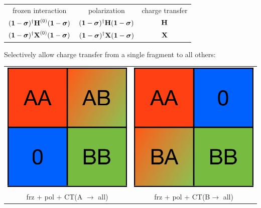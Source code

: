 \documentclass[%
    xcolor=usenames,dvipsnames,svgnames%
]{beamer}
\begin{document}
\begin{frame}
\begin{table}
\begin{tabular}{ccc}
      frozen interaction & polarization & charge transfer \\
      \((\boldsymbol{\mathbf{1}} - \boldsymbol{\mathbf{\sigma}})^{\dagger} \boldsymbol{\mathbf{H}}^{(0)} (\boldsymbol{\mathbf{1}} - \boldsymbol{\mathbf{\sigma}})\) & \((\boldsymbol{\mathbf{1}} - \boldsymbol{\mathbf{\sigma}})^{\dagger} \boldsymbol{\mathbf{H}} (\boldsymbol{\mathbf{1}} - \boldsymbol{\mathbf{\sigma}})\) & \(\boldsymbol{\mathbf{H}}\) \\
      \((\boldsymbol{\mathbf{1}} - \boldsymbol{\mathbf{\sigma}})^{\dagger} \boldsymbol{\mathbf{X}}^{(0)} (\boldsymbol{\mathbf{1}} - \boldsymbol{\mathbf{\sigma}})\) & \((\boldsymbol{\mathbf{1}} - \boldsymbol{\mathbf{\sigma}})^{\dagger} \boldsymbol{\mathbf{X}} (\boldsymbol{\mathbf{1}} - \boldsymbol{\mathbf{\sigma}})\) & \(\boldsymbol{\mathbf{X}}\)
    \end{tabular}
  \end{table}
  Selectively allow charge transfer from a single fragment to all others:
  \begin{table}
    \centering
    \begin{tabular}{cc}
      \includegraphics[scale=0.30]{./figures/block_ab_0.pdf} & \includegraphics[scale=0.30]{./figures/block_ba_0.pdf} \\
      frz + pol + CT(A \(\rightarrow\) all) & frz + pol + CT(B\(\rightarrow\) all)
    \end{tabular}
  \end{table}
\end{frame}
\end{document}
